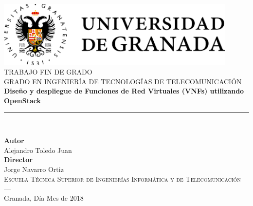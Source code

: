 \begin{titlepage}


\newlength{\centeroffset}
\setlength{\centeroffset}{-0.5\oddsidemargin}
\addtolength{\centeroffset}{0.5\evensidemargin}
\thispagestyle{empty}

\noindent\hspace*{\centeroffset}\begin{minipage}{\textwidth}

\centering
\includegraphics[width=0.9\textwidth]{imagenes/portada/logo_ugr_nuevo.png}\\[1.4cm]

\textsc{ \Large TRABAJO FIN DE GRADO\\[0.2cm]}
\textsc{ GRADO EN INGENIERÍA DE TECNOLOGÍAS DE TELECOMUNICACIÓN}\\[1cm]
%
{\Huge\bfseries Diseño y despliegue de Funciones de Red Virtuales (VNFs) utilizando OpenStack \\
}
\noindent\rule[-1ex]{\textwidth}{3pt}\\[3.5ex]
{\large\bfseries}
\end{minipage}

\vspace{1.6cm}
\noindent\hspace*{\centeroffset}\begin{minipage}{\textwidth}
\centering

\textbf{Autor}\\ { Alejandro Toledo Juan}\\[2.5ex]
\textbf{Director}\\
{Jorge Navarro Ortiz}\\[2cm]
\textsc{Escuela Técnica Superior de Ingenierías Informática y de Telecomunicación}\\
\textsc{---}\\
Granada, Día Mes de 2018
\end{minipage}
\end{titlepage}


